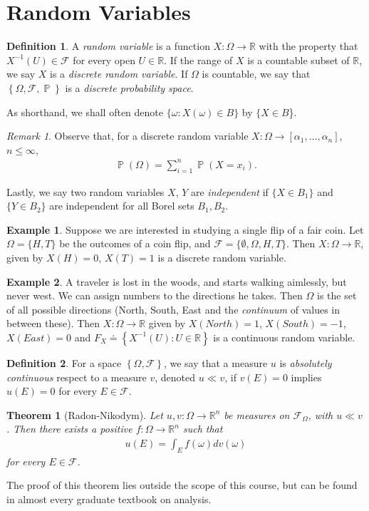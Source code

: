 \documentclass[12pt]{amsbook}
\newcommand{\rr}{\mathbb{R}}
\newcommand{\filter}{\mathcal{F}}
\DeclareMathOperator{\prob}{\mathbb{P}}
\theoremstyle{plain}
\newtheorem{theorem}{Theorem}
\theoremstyle{definition}
\newtheorem*{definition}{Definition}
\newtheorem*{example}{Example}
\theoremstyle{remark}
\newtheorem*{remark}{Remark}
\numberwithin{equation}{section}  %
\numberwithin{equation}{section}  %
\begin{document}
\section{Random Variables} 
\begin{definition}
	A \emph{random variable} is a function $X: \Omega \to \rr$ with the property
	that $X^{-1}(U) \in \filter$ for every open $U \in \rr$. If the range of $X$
	is a countable subset of $\rr$, we say $X$
	is a \emph{discrete random variable}. If $\Omega$ is countable, we say that 
	$\left\{ \Omega, \filter, \prob \right\}$ is a \emph{discrete probability 
	space}.
\end{definition}
As shorthand, we shall often denote $\{\omega: X(\omega) \in B\}$ by
$\{X \in B$\}.
\begin{remark}
	Observe that, for a discrete random variable $X: \Omega \to [\alpha_1,
	\ldots, \alpha_n]$,  $n \le \infty$, 
	\begin{align*}
		\prob(\Omega) = \sum_{i =1}^n \prob(X = x_i).
	\end{align*}
\end{remark}
Lastly, we say two random variables $X$, $Y$ are \emph{independent} if
$\{X \in B_1\}$ and $\{Y \in B_2\}$ are independent for all Borel sets
$B_1, B_2$. 
\begin{example}
	Suppose we are interested in studying a single flip of a fair coin.
	Let
	$\Omega = \{H, T\}$ be the outcomes of a coin flip, and
	$\filter = \{\emptyset, \Omega, H, T \}$. Then $X: \Omega \to \rr$, given by
	$X(H) = 0$, $X(T) = 1$ is a discrete random variable.
\end{example}
\begin{example}
	A traveler is lost in the woods, and starts walking aimlessly, but never
	west. 
	We can assign numbers to the directions he takes. 
	Then $\Omega$ is the set of all possible directions (North, South, East
	and the \emph{continuum} of values in between these). Then
	$X: \Omega \to \rr$ given by $X(North) = 1$, $X(South) = -1$, $X(East) = 0$
	and $F_{X} \doteq \left\{ X^{-1}(U): U \in \rr \right\}$ is a continuous 
	random
	variable.
\end{example}
\begin{definition}
	For a space $\left\{ \Omega, \filter \right\}$, we say that a measure $u$ is
	\emph{absolutely continuous} respect to a measure $v$, denoted $u \ll v$, if
	$v(E) = 0$ implies $u(E) = 0$ for every $E \in \filter$.
\end{definition}
\begin{theorem}[Radon-Nikodym]
	Let $u,v: \Omega \to \rr^n$ be measures on $\filter_{\Omega}$, with $u \ll 
	v$.
	Then there exists a positive $f: \Omega \to \rr^n$ such that
	\begin{align*}
		u(E) = \int_{E} f(\omega) dv(\omega)
	\end{align*}
	for every $E \in \filter$.
\end{theorem}
The proof of this theorem lies outside the scope of this course, but can be
found in almost every graduate textbook on analysis. 
\end{document}
